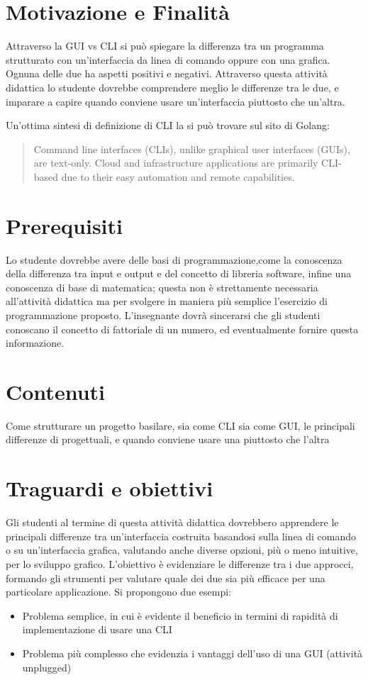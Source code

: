 \section{Motivazione e Finalità}

Attraverso la GUI vs CLI si può spiegare la differenza tra un programma strutturato con un'interfaccia da linea di comando oppure con una grafica. Ognuna delle due ha aspetti positivi e  negativi. Attraverso questa attività didattica lo studente dovrebbe comprendere meglio le differenze tra le due, e imparare a capire quando conviene usare un'interfaccia piuttosto che un'altra.

Un'ottima sintesi di definizione di CLI la si può trovare sul sito di Golang:
\begin{quote}
    
Command line interfaces (CLIs), unlike graphical user interfaces (GUIs), are text-only. Cloud and infrastructure applications are primarily CLI-based due to their easy automation and remote capabilities. 

\end{quote}

\section{Prerequisiti}
Lo studente dovrebbe avere delle basi di programmazione,come la conoscenza della differenza tra input e output e del concetto di libreria software, infine una conoscenza di  base di matematica; questa non è strettamente necessaria all'attività didattica ma per svolgere in maniera più semplice l'esercizio di programmazione proposto. L'insegnante dovrà sincerarsi che gli studenti conoscano il concetto di fattoriale di un numero, ed eventualmente fornire questa informazione. 

\section{Contenuti}
Come strutturare un progetto basilare, sia come CLI sia come GUI, le principali differenze di progettuali, e quando conviene usare una piuttosto che l'altra

\section{Traguardi e obiettivi}
Gli studenti al termine di questa attività didattica dovrebbero apprendere le principali differenze tra un'interfaccia costruita basandosi sulla linea di comando o su un'interfaccia grafica, valutando anche diverse opzioni, più o meno intuitive, per lo sviluppo grafico. L'obiettivo è evidenziare le differenze tra i due approcci, formando gli strumenti per valutare quale dei due sia più efficace per una particolare applicazione. 
Si propongono due esempi:
\begin{itemize}
\item Problema semplice, in cui è evidente il beneficio in termini di rapidità di implementazione di usare una CLI
\item Problema più complesso che evidenzia i vantaggi dell'uso di una GUI (attività unplugged)
\end{itemize}